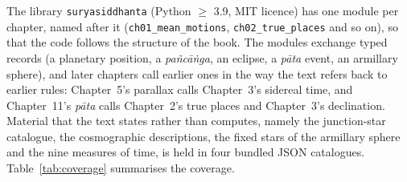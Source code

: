 \documentclass[11pt,a4paper]{article}
\newcommand{\file}[1]{\texttt{#1}}
\begin{document}
The library \file{suryasiddhanta} (Python $\geq$ 3.9, MIT licence) has one module per chapter, named after it (\file{ch01\_mean\_motions}, \file{ch02\_true\_places} and so on), so that the code follows the structure of the book. The modules exchange typed records (a planetary position, a \textit{pa\~nc\=a\.nga}, an eclipse, a \textit{p\=ata} event, an armillary sphere), and later chapters call earlier ones in the way the text refers back to earlier rules: Chapter~5's parallax calls Chapter~3's sidereal time, and Chapter~11's \textit{p\=ata} calls Chapter~2's true places and Chapter~3's declination. Material that the text states rather than computes, namely the junction-star catalogue, the cosmographic descriptions, the fixed stars of the armillary sphere and the nine measures of time, is held in four bundled JSON catalogues. Table~\ref{tab:coverage} summarises the coverage.
\end{document}

